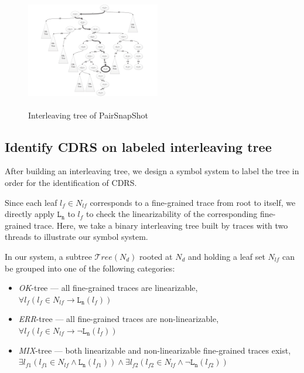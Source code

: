 \documentclass[runningheads]{llncs}
\begin{document}
\begin{figure}
\centering
\vspace{-0.7cm}
\includegraphics[height = 2in, width = 2.3in]{pssinttree.pdf}
\vspace{-0.2cm}
\caption{Interleaving tree of PairSnapShot}\label{fig:interleavingtreeofpairsnapshot}
\end{figure}




\subsection{Identify CDRS on labeled interleaving tree}\label{sec:identifycdrs}
After building an interleaving tree, we design a symbol system to label the tree in order for the identification of CDRS.



Since each leaf $l_f\in N_{lf}$ corresponds to a fine-grained trace from root to itself, we directly apply $\mathtt{L_n}$ to $l_f$ to check the linearizability of the corresponding fine-grained trace. Here, we take a binary interleaving tree built by traces with two threads to illustrate our symbol system.

In our system, a subtree $\mathcal{T}ree(N_{d})$ rooted at $N_d$ and holding a leaf set $N_{lf}$ can be grouped into one of the following categories:
\begin{itemize}
  \item \textit{OK}-tree --- all fine-grained traces are linearizable,\\
  $\forall l_f \left( l_f\in N_{lf} \rightarrow \mathtt{L_n}(l_f)\right)$
  \item \textit{ERR}-tree --- all fine-grained traces are non-linearizable,\\
  $\forall l_f \left(  l_f\in N_{lf} \rightarrow \neg \mathtt{L_n}(l_f)\right)$
  \item \textit{MIX}-tree --- both linearizable and non-linearizable fine-grained traces exist,\\
  $\exists l_{f1} ( l_{f1}\in N_{lf} \wedge \mathtt{L_n}(l_{f1})) \wedge  \exists l_{f2} (l_{f2}\in N_{lf} \wedge \neg \mathtt{L_n}(l_{f2}))$

\end{itemize}
\end{document}
